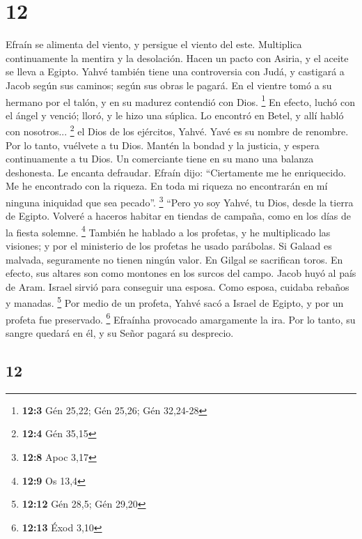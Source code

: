 \begin{paracol}{2}
\hypertarget{section-22}{%
\section{12}\label{section-22}}

 Efraín se alimenta del viento, y persigue el viento del
este. Multiplica continuamente la mentira y la desolación. Hacen un
pacto con Asiria, y el aceite se lleva a Egipto.  Yahvé
también tiene una controversia con Judá, y castigará a Jacob según sus
caminos; según sus obras le pagará.  En el vientre tomó a
su hermano por el talón, y en su madurez contendió con Dios. \footnote{\textbf{12:3}
  Gén 25,22; Gén 25,26; Gén 32,24-28}  En efecto, luchó
con el ángel y venció; lloró, y le hizo una súplica. Lo encontró en
Betel, y allí habló con nosotros... \footnote{\textbf{12:4} Gén 35,15}
 el Dios de los ejércitos, Yahvé. Yavé es su nombre de
renombre.  Por lo tanto, vuélvete a tu Dios. Mantén la
bondad y la justicia, y espera continuamente a tu Dios. 
Un comerciante tiene en su mano una balanza deshonesta. Le encanta
defraudar.  Efraín dijo: ``Ciertamente me he enriquecido.
Me he encontrado con la riqueza. En toda mi riqueza no encontrarán en mí
ninguna iniquidad que sea pecado''. \footnote{\textbf{12:8} Apoc 3,17}
 ``Pero yo soy Yahvé, tu Dios, desde la tierra de Egipto.
Volveré a haceros habitar en tiendas de campaña, como en los días de la
fiesta solemne. \footnote{\textbf{12:9} Os 13,4}  También
he hablado a los profetas, y he multiplicado las visiones; y por el
ministerio de los profetas he usado parábolas.  Si Galaad
es malvada, seguramente no tienen ningún valor. En Gilgal se sacrifican
toros. En efecto, sus altares son como montones en los surcos del campo.
 Jacob huyó al país de Aram. Israel sirvió para conseguir
una esposa. Como esposa, cuidaba rebaños y manadas. \footnote{\textbf{12:12}
  Gén 28,5; Gén 29,20}  Por medio de un profeta, Yahvé
sacó a Israel de Egipto, y por un profeta fue preservado. \footnote{\textbf{12:13}
  Éxod 3,10}  Efraínha provocado amargamente la ira. Por
lo tanto, su sangre quedará en él, y su Señor pagará su desprecio.

\switchcolumn
\begin{otherlanguage}{english}

\hypertarget{section-23}{%
\section{12}\label{section-23}}


\end{otherlanguage}
\end{paracol}

